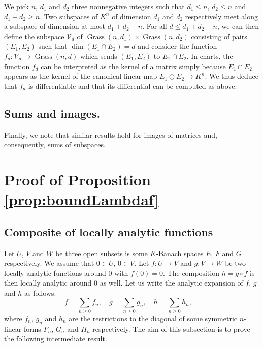 \documentclass{sig-alternate}
\DeclareMathOperator{\Grass}{Grass}
\begin{document}
{We pick $n$, $d_1$ and 
$d_2$ three nonnegative integers such that $d_1 \leq n$, $d_2 \leq n$ 
and $d_1 + d_2 \geq n$. Two subspaces of $K^n$ of dimension $d_1$ and 
$d_2$ respectively meet along a subspace of dimension at most $d_1 + d_2 
- n$. For all $d \leq d_1 + d_2 -n$, we can then define the subspace 
$\mathcal V_d$ of $\Grass(n,d_1) \times \Grass(n,d_2)$ consisting of 
pairs $(E_1, E_2)$ such that $\dim (E_1 \cap E_2) = d$ and consider the 
function $f_d : \mathcal V_d \to \Grass(n, d)$ which sends $(E_1, E_2)$ 
to $E_1 \cap E_2$. In charts, the function $f_d$ can be interpreted as
the kernel of a matrix simply because $E_1 \cap E_2$ appears as the
kernel of the canonical linear map $E_1 \oplus E_2 \to K^n$. We thus deduce
that $f_d$ is differentiable and that its differential can be
computed as above.

\subsection*{Sums and images.}

Finally, we note that similar results hold for images of matrices and,
consequently, sums of subspaces.

}

\appendix

\section{Proof of Proposition \ref{prop:boundLambdaf}}
\label{app:proof}

\subsection{Composite of locally analytic functions}

Let $U$, $V$ and $W$ be three open subsets is some $K$-Banach spaces 
$E$, $F$ and $G$ respectively. We assume that $0 \in U$, $0 \in V$. Let 
$f : U \to V$ and $g : V \to W$ be two locally analytic functions around 
$0$ with $f(0) = 0$. The composition $h = g \circ f$ is then locally 
analytic around $0$ as well. Let us write the analytic expansion of $f$, 
$g$ and $h$ as follows:
$$f = \sum_{n \geq 0} f_n, \quad 
g = \sum_{n \geq 0} g_n, \quad
h = \sum_{n \geq 0} h_n, \quad$$
where $f_n$, $g_n$ and $h_n$ are the restrictions to the diagonal of 
some symmetric $n$-linear forms $F_n$, $G_n$ and $H_n$ respectively. The 
aim of this subsection is to prove the following intermediate result.
\end{document}
